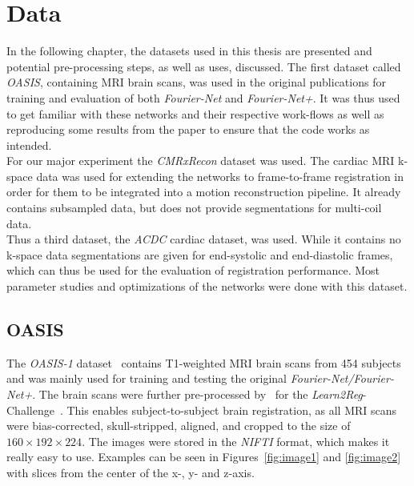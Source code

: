 \documentclass[english,version-2022-01]{uzl-thesis} %
\begin{document}
\chapter{Data}	\label{Ch:Data}
In the following chapter, the datasets used in this thesis are presented and potential pre-processing steps, as well as uses, discussed. The first dataset called \emph{OASIS}, containing MRI brain scans, was used in the original publications for training and evaluation of both \emph{Fourier-Net} and \emph{Fourier-Net+}. It was thus used to get familiar with these networks and their respective work-flows as well as reproducing some results from the paper to ensure that the code works as intended.\\ 
For our major experiment the \emph{CMRxRecon} dataset was used. The cardiac MRI k-space data was used for extending the networks to frame-to-frame registration in order for them to be integrated into a motion reconstruction pipeline. It already contains subsampled data, but does not provide segmentations for multi-coil data.\\
Thus a third dataset, the \emph{ACDC} cardiac dataset, was used. While it contains no k-space data segmentations are given for end-systolic and end-diastolic frames, which can thus be used for the evaluation of registration performance. Most parameter studies and optimizations of the networks were done with this dataset.

\section{OASIS} \label{Sec:OASIS}
The \emph{OASIS-1} dataset~\cite{OASIS} contains T1-weighted MRI brain scans from 454 subjects and was mainly used for training and testing the original \emph{Fourier-Net/Fourier-Net+}. The brain scans were further pre-processed by~\cite{HyperMorph} for the \emph{Learn2Reg}-Challenge~\cite{Learn2Reg}. This enables subject-to-subject brain registration, as all MRI scans were bias-corrected, skull-stripped, aligned, and cropped to the size of $160 \times 192 \times 224$. The images were stored in the \emph{NIFTI} format,  which makes it really easy to use. Examples can be seen in Figures~\ref{fig:image1} and \ref{fig:image2} with slices from the center of the x-, y- and z-axis.
\end{document}
